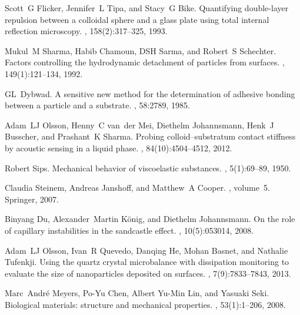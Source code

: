 \documentclass[floatfix,superscriptaddress,a4paper,twocolumn]{revtex4-1}
\begin{document}
\begin{thebibliography}{10}
  Scott~G Flicker, Jennifer~L Tipa, and Stacy~G Bike.
  \newblock Quantifying double-layer repulsion between a colloidal sphere and a
  glass plate using total internal reflection microscopy.
  , 158(2):317--325,
  1993.

  Mukul~M Sharma, Habib Chamoun, DSH Sarma, and Robert~S Schechter.
  \newblock Factors controlling the hydrodynamic detachment of particles from
  surfaces.
  , 149(1):121--134,
  1992.

  GL~Dybwad.
  \newblock A sensitive new method for the determination of adhesive bonding
  between a particle and a substrate.
  , 58:2789, 1985.

  Adam~LJ Olsson, Henny~C van~der Mei, Diethelm Johannsmann, Henk~J Busscher, and
  Prashant~K Sharma.
  \newblock Probing colloid--substratum contact stiffness by acoustic sensing in
  a liquid phase.
  , 84(10):4504--4512, 2012.

  Robert Sips.
  \newblock Mechanical behavior of viscoelastic substances.
  , 5(1):69--89, 1950.

  Claudia Steinem, Andreas Janshoff, and Matthew~A Cooper.
  , volume~5.
  \newblock Springer, 2007.

  Binyang Du, Alexander~Martin K{\"o}nig, and Diethelm Johannsmann.
  \newblock On the role of capillary instabilities in the sandcastle effect.
  , 10(5):053014, 2008.

  Adam~LJ Olsson, Ivan~R Quevedo, Danqing He, Mohan Basnet, and Nathalie
  Tufenkji.
  \newblock Using the quartz crystal microbalance with dissipation monitoring to
  evaluate the size of nanoparticles deposited on surfaces.
  , 7(9):7833--7843, 2013.

  Marc~Andr{\'e} Meyers, Po-Yu Chen, Albert Yu-Min Lin, and Yasuaki Seki.
  \newblock Biological materials: structure and mechanical properties.
  , 53(1):1--206, 2008.


\end{thebibliography}
\end{document}
